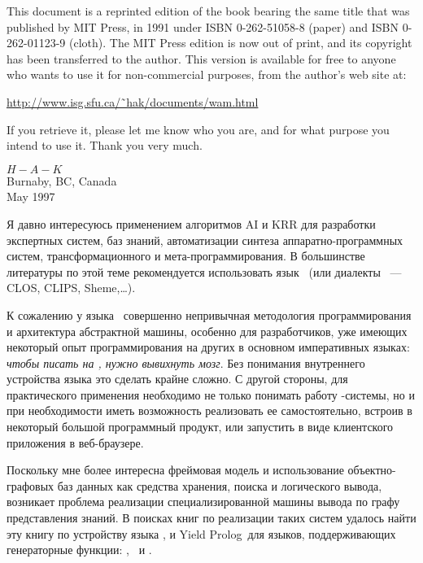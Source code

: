 \clearpage
{}

This document is a reprinted edition of the book bearing the same title that was
published by MIT Press, in 1991 under ISBN 0-262-51058-8 (paper) and ISBN
0-262-01123-9 (cloth). The MIT Press edition is now out of print, and its
copyright has been transferred to the author. This version is available for free
to anyone who wants to use it for non-commercial purposes, from the author’s web
site at:

\medskip
\url{http://www.isg.sfu.ca/˜hak/documents/wam.html}
\medskip

\noindent
If you retrieve it, please let me know who you are, and for what purpose you
intend to use it.
Thank you very much.
\begin{flushright}
$H-A-K$\\
Burnaby, BC, Canada\\
May 1997
\end{flushright}



\clearpage
{}

Я давно интересуюсь применением алгоритмов AI и
KRR для разработки экспертных систем, баз знаний,
автоматизации синтеза аппаратно-програм\-мных систем\cite{bibilo},
трансформационного и
мета-программирования. В большинстве литературы по этой теме рекомендуется
использовать язык \prolog\ (или диалекты \lisp\ --- CLOS, CLIPS,
Sheme,\ldots).

К сожалению у языка \prolog\ совершенно непривычная методология программирования
и архитектура абстрактной машины, особенно для разработчиков, уже имеющих
некоторый опыт программирования на других в основном императивных языках:
\emph{чтобы писать на \prolog, нужно вывихнуть мозг}. Без понимания внутреннего
устройства языка это сделать крайне сложно.
С другой стороны, для практического применения необходимо не только понимать
работу \prolog-системы, но и при необходимости иметь возможность реализовать ее
самостоятельно, встроив в некоторый большой программный продукт, или запустить в
виде клиентского приложения в веб-браузере.

Поскольку мне более интересна фреймовая модель\cite{minsky} и использование
объектно-графовых баз данных как средства хранения, поиска и логического вывода,
возникает проблема реализации специализированной машины вывода по графу
представления знаний. В поисках книг по реализации таких систем удалось
найти эту книгу по устройству языка \prolog, и Yield
Prolog\ для языков,
поддерживающих генераторные функции: \py, \js\ и \csharp.

